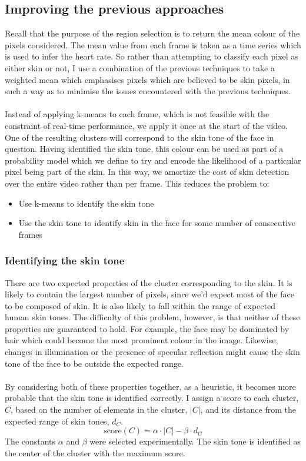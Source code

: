 \subsection{Improving the previous approaches}
Recall that the purpose of the region selection is to return the mean colour of the pixels considered. The mean value from each frame is taken as a time series which is used to infer the heart rate. So rather than attempting to classify each pixel as either skin or not, I use a combination of the previous techniques to take a weighted mean which emphasises pixels which are believed to be skin pixels, in such a way as to minimise the issues encountered with the previous techniques.
\\ \\
Instead of applying k-means to each frame, which is not feasible with the constraint of real-time performance, we apply it once at the start of the video.
One of the resulting clusters will correspond to the skin tone of the face in question.
Having identified the skin tone, this colour can be used as part of a probability model which we define to try and encode the likelihood of a particular pixel being part of the skin. 
In this way, we amortize the cost of skin detection over the entire video rather than per frame.
This reduces the problem to: 
\begin{itemize}
   \item Use k-means to identify the skin tone
   \item Use the skin tone to identify skin in the face for some number of consecutive frames 
\end{itemize}
\subsubsection{Identifying the skin tone}
There are two expected properties of the cluster corresponding to the skin. It is likely to contain the largest number of pixels, since we'd expect most of the face to be composed of skin. It is also likely to fall within the range of expected human skin tones.
The difficulty of this problem, however, is that neither of these properties are guaranteed to hold.
For example, the face may be dominated by hair which could become the most prominent colour in the image. Likewise, changes in illumination or the presence of specular reflection might cause the skin tone of the face to be outside the expected range.
\\ \\
By considering both of these properties together, as a heuristic, it becomes more probable that the skin tone is identified correctly. I assign a score to each cluster, $C$, based on the number of elements in the cluster, $|C|$, and its distance from the expected range of skin tones, $d_C$.
\begin{equation*}
    \mathrm{score}(C) = \alpha\cdot |C| - \beta\cdot d_C
\end{equation*}
The constants $\alpha$ and $\beta$ were selected experimentally. The skin tone is identified as the center of the cluster with the maximum score.

